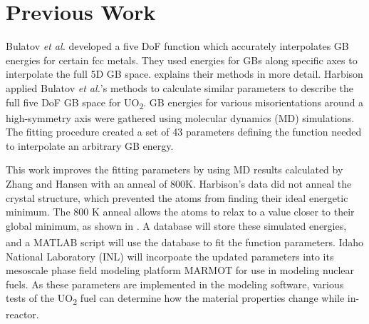 \documentclass[12pt]{report}
\begin{document}
\section{Previous Work\label{intro:prevWork}}
Bulatov \emph{et al.}\cite{bulatov2014} developed a five DoF function which accurately interpolates GB energies for certain fcc metals.  They used energies for GBs along specific axes to interpolate the full 5D GB space.   explains their methods in more detail.  Harbison\cite{harbison2015} applied Bulatov \emph{et al.}'s methods to calculate similar parameters to describe the full five DoF GB space for UO\textsubscript{2}.  GB energies for various misorientations around a high-symmetry axis were gathered using molecular dynamics (MD) simulations.  The fitting procedure created a set of 43 parameters defining the function needed to interpolate an arbitrary GB energy.

This work improves the fitting parameters by using MD results calculated by Zhang\cite{zhang2016} and Hansen\cite{hansen2016} with an anneal of 800K.  Harbison's data did not anneal the crystal structure\cite{harbison2015}, which prevented the atoms from finding their ideal energetic minimum.  The 800 K anneal allows the atoms to relax to a value closer to their global minimum, as shown in .  A database will store these simulated energies, and a MATLAB\textsuperscript{\textregistered} script will use the database to fit the function parameters.  Idaho National Laboratory (INL) will incorpoate the updated parameters into its mesoscale phase field modeling platform MARMOT for use in modeling nuclear fuels.  As these parameters are implemented in the modeling software, various tests of the UO\textsubscript{2} fuel can determine how the material properties change while in-reactor. 

\end{document}
